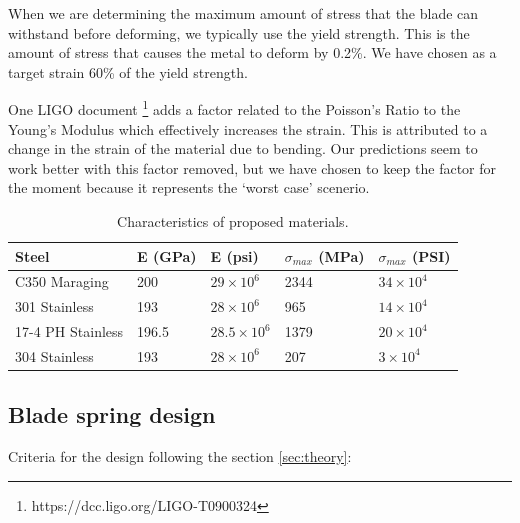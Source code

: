 When we are determining the maximum amount of stress that the blade can withstand before deforming, we typically use the yield strength.  This is the amount of stress that causes the metal to deform by 0.2\%.  We have chosen as a target strain 60\% of the yield strength.

One LIGO document \footnote{https://dcc.ligo.org/LIGO-T0900324} adds a factor related to the Poisson's Ratio to the Young's Modulus which effectively increases the strain.  This is attributed to a change in the strain of the material due to bending.  Our predictions seem to work better with this factor removed, but we have chosen to keep the factor for the moment because it represents the `worst case' scenerio.  



\begin{table}[ht]
	\centering
		\begin{tabular}{ l | l | l | l | l }
			Steel & E (GPa) & E (psi) & $\sigma_{max}$ (MPa)  & $\sigma_{max}$ (PSI) \\ \hline
			C350 Maraging & 200 & $29\times10^6$ & 2344 & $34\times10^4$ \\ \hline
			301 Stainless & 193 & $28\times10^6$ & 965 & $14\times10^4$ \\ \hline
			17-4 PH Stainless & 196.5 & $28.5\times10^6$ & 1379 & $20\times10^4$\\ \hline
			304 Stainless &  193 & $28\times10^6$ & 207 & $3\times10^4$
		\end{tabular}
	\caption{Characteristics of proposed materials.}
	\label{tab:materials}
\end{table}

\subsection{Blade spring design}

Criteria for the design following the section \ref{sec:theory}:

